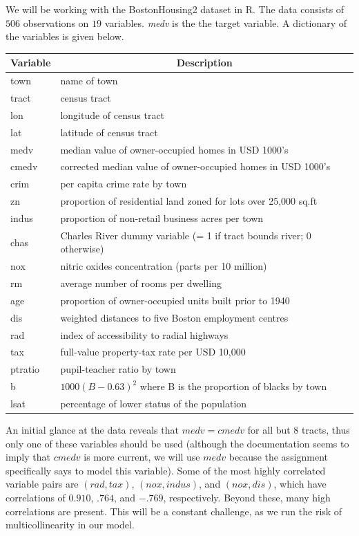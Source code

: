 \documentclass[12pt]{article}
\newcommand*{\thead}[1]{\multicolumn{1}{|c|}{\bfseries #1}}
\begin{document}
We will be working with the BostonHousing2 dataset in R.  The data consists of $506$ observations on $19$ variables.  \emph{medv} is the the target variable.  A dictionary of the variables is given below.
\begin{center}
\renewcommand{\arraystretch}{1.2}
\begin{tabular}{|l|l|}
\hline
\thead{Variable} & \thead{Description} \\
\hline 
town & name of town \\ 
\hline 
tract & census tract \\ 
\hline 
lon & longitude of census tract \\ 
\hline 
lat & latitude of census tract \\ 
\hline 
medv & median value of owner-occupied homes in USD 1000's \\ 
\hline 
cmedv & corrected median value of owner-occupied homes in USD 1000's \\ 
\hline 
crim & per capita crime rate by town \\ 
\hline 
zn & proportion of residential land zoned for lots over 25,000 sq.ft \\ 
\hline 
indus & proportion of non-retail business acres per town \\ 
\hline 
chas & Charles River dummy variable (= 1 if tract bounds river; 0 otherwise) \\ 
\hline 
nox & nitric oxides concentration (parts per 10 million) \\ 
\hline 
rm & average number of rooms per dwelling \\ 
\hline 
age & proportion of owner-occupied units built prior to 1940 \\ 
\hline 
dis & weighted distances to five Boston employment centres \\ 
\hline 
rad & index of accessibility to radial highways \\ 
\hline 
tax & full-value property-tax rate per USD 10,000 \\ 
\hline 
ptratio & pupil-teacher ratio by town \\ 
\hline 
b & $1000(B - 0.63)^2$ where B is the proportion of blacks by town \\ 
\hline 
lsat & percentage of lower status of the population \\ 
\hline 
\end{tabular} 
\end{center}

An initial glance at the data reveals that $medv = cmedv$ for all but 8 tracts, thus only one of these variables should be used (although the documentation seems to imply that $cmedv$ is more current, we will use $medv$ because the assignment specifically says to model this variable).  Some of the most highly correlated variable pairs are $(rad,tax)$, $(nox,indus)$, and $(nox,dis)$, which have correlations of $0.910$, $.764$, and $-.769$, respectively.  Beyond these, many high correlations are present.  This will be a constant challenge, as we run the risk of multicollinearity in our model.
\end{document}
